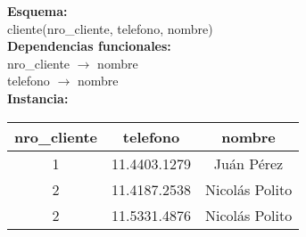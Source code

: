 \documentclass[preview]{standalone}
\begin{document}
\textbf{Esquema:}\\
cliente(nro\_cliente, telefono, nombre)\\

\textbf{Dependencias funcionales:}\\
nro\_cliente $\rightarrow$ nombre\\
telefono $\rightarrow$ nombre\\

\textbf{Instancia:}\\
\begin{center}
\begin{tabular}{| c | c | c |}\hline			
	nro\_cliente & telefono & nombre \\\hline			
	1 & 11.4403.1279 & Ju\'an P\'erez \\
	2 & 11.4187.2538 & Nicol\'as Polito \\
	2 & 11.5331.4876 & Nicol\'as Polito \\\hline  
\end{tabular}
\end{center}
\end{document}
